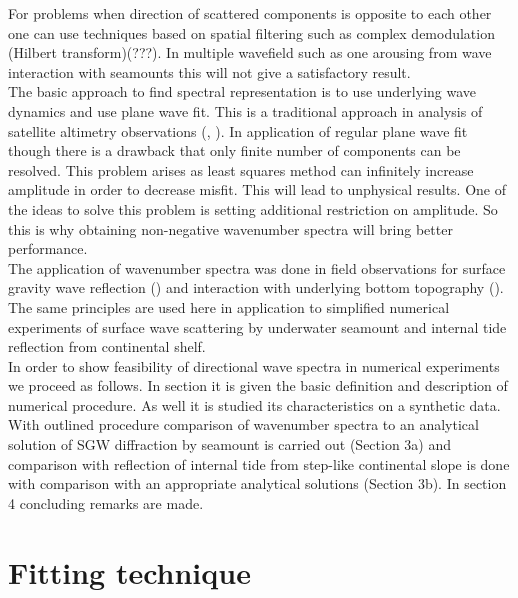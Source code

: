 For problems when direction of scattered components is opposite to each other one can use techniques based on spatial filtering such as complex demodulation (Hilbert transform)\cite{mercier2008reflection}(???). In multiple wavefield such as one arousing from wave interaction with seamounts this will not give a satisfactory result.\\
The basic approach to find spectral representation is to use underlying wave dynamics and use plane wave fit. This is a traditional approach in analysis of satellite altimetry observations (\cite{ray2001estimates}, \cite{zhao2016global}). In application of regular plane wave fit though there is a drawback that only finite number of components can be resolved. This problem arises as least squares method can infinitely increase amplitude in order to decrease misfit. This will lead to unphysical results. One of the ideas to solve this problem is setting additional restriction on amplitude. So this is why obtaining non-negative wavenumber spectra will bring better performance.\\
The application of wavenumber spectra was done in field observations for surface gravity wave reflection (\cite{dickson1995wave}) and interaction with underlying bottom topography (\cite{thomson2005reflection}). The same principles are used here in application to simplified numerical experiments of surface wave scattering by underwater seamount and internal tide reflection from continental shelf.\\
In order to show feasibility of directional wave spectra in numerical experiments we proceed as follows. In section it is given the basic definition and description of numerical procedure. As well it is studied its characteristics on a synthetic data. With outlined procedure comparison of wavenumber spectra to an analytical solution of SGW diffraction by seamount is carried out (Section 3a) and comparison with reflection of internal tide from step-like continental slope is done with comparison with an appropriate analytical solutions (Section 3b). In section 4 concluding remarks are made.

\section{Fitting technique}
